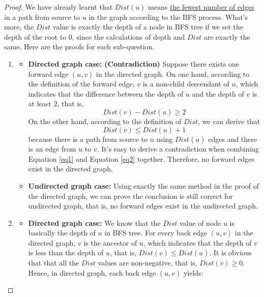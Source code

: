 \documentclass[12pt,a4paper]{article}
\theoremstyle{definition}
\begin{document}
\begin{enumerate}
    \begin{proof} We have already learnt that $Dist(u)$ means \underline{the fewest number of edges} in a path from source to $u$ in the graph according to the BFS process. What's more, the $Dist$ value is exactly the depth of a node in BFS tree if we set the depth of the root to $0$, since the calculations of depth and $Dist$ are exactly the same. Here are the proofs for each sub-question.
    \begin{enumerate}
    \item
    \begin{itemize}
         \item \textbf{\color{purple} Directed graph case: }
         \textbf{(Contradiction)} Suppose there exists one forward edge $(u, v)$ in the directed graph. On one hand, according to the definition of the forward edge, $v$ is a non-child descendant of $u$, which indicates that the difference between the depth of $u$ and the depth of $v$ is at least $2$, that is,
         \begin{equation}
         Dist(v) - Dist(u) \geq 2
         \label{eq1}
         \end{equation}
         On the other hand, according to the definition of $Dist$, we can derive that
         \begin{equation}
         Dist(v) \leq Dist(u) + 1
         \label{eq2}
         \end{equation}
         because there is a path from source to $u$ using $Dist(u)$ edges and there is an edge from $u$ to $v$. It's easy to derive a contradiction when combining Equation \eqref{eq1} and Equation \eqref{eq2} together. Therefore, no forward edges exist in the directed graph.
         \item \textbf{\color{purple} Undirected graph case: } Using exactly the same method in the proof of the directed graph, we can prove the conclusion is still correct for undirected graph, that is, no forward edges exist in the undirected graph.
    \end{itemize}
    \item
        \begin{itemize}
        \item \textbf{\color{purple} Directed graph case: }
        We know that the $Dist$ value of node $u$ is basically the depth of $u$ in BFS tree. For every back edge $(u, v)$ in the directed graph, $v$ is the ancestor of $u$, which indicates that the depth of $v$ is less than the depth of $u$, that is, $Dist(v) \leq Dist(u)$. It is obvious that that all the $Dist$ values are non-negative, that is, $Dist(v) \geq 0$. Hence, in directed graph, each back edge $(u,v)$ yields:

\end{itemize}
\end{enumerate}
\end{proof}
\end{enumerate}
\end{document}
